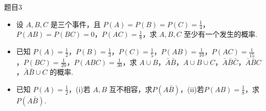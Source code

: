 \begin{question}{题目3}
    \begin{itemize}
        \item [(1)] 设 $A,B,C$ 是三个事件，且 $P(A) = P(B) = P(C) = \frac{1}{4}$，$P(AB) = P(BC) = 0$，$P(AC) = \frac{1}{8}$，求 $A,B,C$ 至少有一个发生的概率.

        \item [(2)] 已知 $P(A) = \frac{1}{2}$，$P(B) = \frac{1}{3}$，$P(C) = \frac{1}{5}$，$P(AB) = \frac{1}{10}$，$P(AC) = \frac{1}{15}$，$P(BC) = \frac{1}{20}$，$P(ABC) = \frac{1}{30}$，求 $A \cup B$，$\bar{A}\bar{B}$，$A \cup B \cup C$，$\bar{A}\bar{B}\bar{C}$，$\bar{A}\bar{B}C$，$\bar{A} \bar{B}\cup C$ 的概率.

        \item [(3)] 已知 $P(A) = \frac{1}{2}$，(i)若 $A,B$ 互不相容，求$P(A\bar{B})$，(ii)若$P(AB) = \frac{1}{8}$，求 $P(A\bar{B})$.
    \end{itemize}
\end{question}
